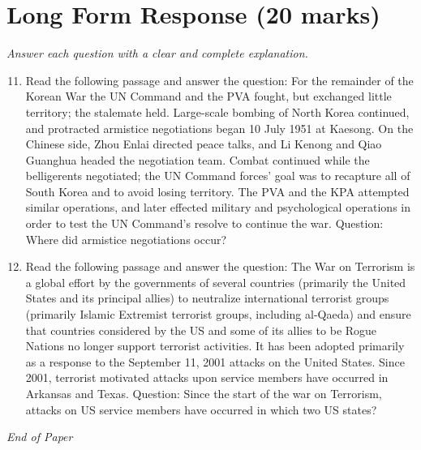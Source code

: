 \documentclass[12pt]{article}
\begin{document}
\section*{Long Form Response (20 marks)}
\textit{Answer each question with a clear and complete explanation.}
\begin{enumerate}[label=\arabic*.]
\setcounter{enumi}{10}
\item Read the following passage and answer the question: For the remainder of the Korean War the UN Command and the PVA fought, but exchanged little territory; the stalemate held. Large-scale bombing of North Korea continued, and protracted armistice negotiations began 10 July 1951 at Kaesong. On the Chinese side, Zhou Enlai directed peace talks, and Li Kenong and Qiao Guanghua headed the negotiation team. Combat continued while the belligerents negotiated; the UN Command forces' goal was to recapture all of South Korea and to avoid losing territory. The PVA and the KPA attempted similar operations, and later effected military and psychological operations in order to test the UN Command's resolve to continue the war. Question: Where did armistice negotiations occur?
\item Read the following passage and answer the question: The War on Terrorism is a global effort by the governments of several countries (primarily the United States and its principal allies) to neutralize international terrorist groups (primarily Islamic Extremist terrorist groups, including al-Qaeda) and ensure that countries considered by the US and some of its allies to be Rogue Nations no longer support terrorist activities. It has been adopted primarily as a response to the September 11, 2001 attacks on the United States. Since 2001, terrorist motivated attacks upon service members have occurred in Arkansas and Texas. Question: Since the start of the war on Terrorism, attacks on US service members have occurred in which two US states?
\end{enumerate}

\vfill
\noindent\textit{End of Paper}
\end{document}

